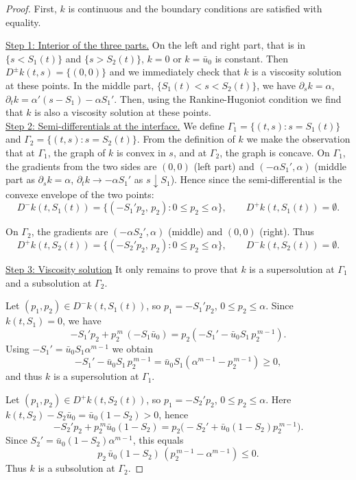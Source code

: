 \documentclass[11pt]{article}
\numberwithin{equation}{section} %
\begin{document}
\begin{proof}
    First, $k$ is continuous and the boundary conditions are satisfied with equality.
    
    \underline{Step 1: Interior of the three parts.} On the left and right part, that is in $\{s<S_1(t)\}$ and $\{s>S_2(t)\}$, $k=0$ or $k=\bar{u}_0$ is constant. Then $D^{\pm}k(t,s)=\{(0,0)\}$ and we immediately check that $k$ is a viscosity solution at these points. In the middle part, $\{S_{1}(t)<s<S_{2}(t)\}$, we have $\partial_sk=\alpha$, $\partial_t k = \alpha'(s-S_1)-\alpha S_1'$. Then, using the Rankine-Hugoniot condition we find that $k$ is also a viscosity solution at these points.\\
    \underline{Step 2: Semi-differentials at the interface.} We define $\Gamma_{1}=\{(t,s): s=S_{1}(t)\}$ and $\Gamma_{2} = \{(t,s): s=S_{2}(t)\}$. From the definition of $k$ we make the observation that at $\Gamma_1$, the graph of $k$ is convex in $s$, and at $\Gamma_2$, the graph is concave.  On $\Gamma_1$, the gradients from the two sides are
$(0,0)$ (left part) and $(-\alpha S_1',\alpha)$ (middle part as $\partial_s k = \alpha$, $\partial_t k\to -\alpha S_1'$ as $s\downarrow S_1$). Hence since the semi-differential is the convexe envelope of the two points: 
$$
D^{-}k(t,S_1(t))=\{(-S_1' p_2,\,p_2): 0\le p_2\le \alpha\},\qquad
D^{+}k(t,S_1(t))=\emptyset.
$$

On $\Gamma_2$, the gradients are $(-\alpha S_2',\alpha)$ (middle) and $(0,0)$ (right). Thus
$$
D^{+}k(t,S_2(t))=\{(-S_2'p_2,\,p_2): 0\le p_2\le \alpha\},\qquad
D^{-}k(t,S_2(t))=\emptyset.
$$

\underline{Step 3: Viscosity solution} It only remains to prove that $k$ is a supersolution at $\Gamma_1$ and a subsolution at $\Gamma_2$.

Let $(p_1,p_2)\in D^{-}k(t,S_1(t))$, so $p_1=-S_1'p_2$, $0\le p_2\le \alpha$.  
Since $k(t,S_1)=0$, we have
$$
-S_1' p_2 + p_2^{\,m}\,(-S_1\bar u_0)
=p_2(-S_1'-\bar u_0 S_1\,p_2^{\,m-1}).
$$
Using $-S_1'=\bar u_0 S_1\alpha^{m-1}$ we obtain
$$
-S_1'-\bar u_0 S_1\,p_2^{\,m-1}
=\bar u_0 S_1(\alpha^{m-1}-p_2^{\,m-1})\ge0,
$$
and thus $k$ is a supersolution at $\Gamma_1$. 

Let $(p_1,p_2)\in D^{+}k(t,S_2(t))$, so $p_1=-S_2'p_2$, $0\le p_2\le\alpha$.  
Here $k(t,S_2)-S_2\bar u_0=\bar u_0(1-S_2)>0$, hence
$$
-S_2' p_2 + p_2^{\,m}\bar u_0(1-S_2)
=p_2\big(-S_2'+\bar u_0(1-S_2)p_2^{\,m-1}\big).
$$
Since $S_2'=\bar u_0(1-S_2)\alpha^{m-1}$, this equals
$$
p_2\,\bar u_0(1-S_2)\,(p_2^{\,m-1}-\alpha^{m-1})\le0.
$$
Thus $k$ is a subsolution at $\Gamma_2$.
    
\end{proof}
\end{document}
